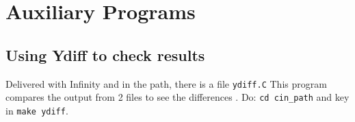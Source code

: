 \chapter{Auxiliary Programs}%
\label{cha:auxiliary_programs}

\section{Using Ydiff to check results}
\label{sec:ydiff_check_results}

Delivered with Infinity \CGG{} and in the \CGG{} path, there is a file \texttt{ydiff.C} This program compares the output from 2 files to see the differences . Do: \texttt{cd cin\_path} and key in \texttt{make ydiff}.


